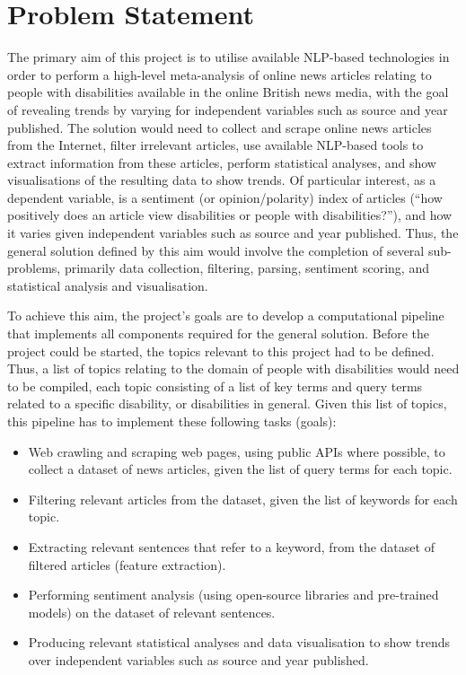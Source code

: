 \documentclass{report}
\begin{document}
\section{Problem Statement} \label{Problem Statement}

The primary aim of this project is to utilise available NLP-based technologies in order to perform a high-level meta-analysis of online news articles relating to people with disabilities available in the online British news media, with the goal of revealing trends by varying for independent variables such as source and year published.
The solution would need to collect and scrape online news articles from the Internet, filter irrelevant articles, use available NLP-based tools to extract information from these articles, perform statistical analyses, and show visualisations of the resulting data to show trends.
Of particular interest, as a dependent variable, is a sentiment (or opinion/polarity) index of articles (``how positively does an article view disabilities or people with disabilities?''), and how it varies given independent variables such as source and year published.
Thus, the general solution defined by this aim would involve the completion of several sub-problems, primarily data collection, filtering, parsing, sentiment scoring, and statistical analysis and visualisation.

To achieve this aim, the project's goals are to develop a computational pipeline that implements all components required for the general solution.
Before the project could be started, the topics relevant to this project had to be defined.
Thus, a list of topics relating to the domain of people with disabilities would need to be compiled, each topic consisting of a list of key terms and query terms related to a specific disability, or disabilities in general.
Given this list of topics, this pipeline has to implement these following tasks (goals):
\begin{itemize}
	\item Web crawling and scraping web pages, using public APIs where possible, to collect a dataset of news articles, given the list of query terms for each topic.
	\item Filtering relevant articles from the dataset, given the list of keywords for each topic.
	\item Extracting relevant sentences that refer to a keyword, from the dataset of filtered articles (feature extraction).
	\item Performing sentiment analysis (using open-source libraries and pre-trained models) on the dataset of relevant sentences.
	\item Producing relevant statistical analyses and data visualisation to show trends over independent variables such as source and year published.
\end{itemize}
\end{document}
